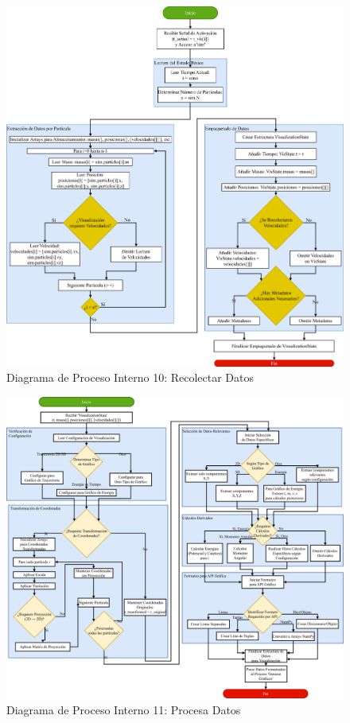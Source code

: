 \begin{figure}[H]
    \centering
    \includegraphics[width=\textwidth]{img/Analisis/DiagramaProcesos/DiagramaProceso10_RecolectarDatos.png}
    \caption{Diagrama de Proceso Interno 10: Recolectar Datos}%
    \label{fig:process_diagram10}
\end{figure}

\begin{figure}[H]
    \centering
    \includegraphics[width=\textwidth]{img/Analisis/DiagramaProcesos/DiagramaProceso011_ProcesarDatos.png}
    \caption{Diagrama de Proceso Interno 11: Procesa Datos}%
    \label{fig:process_diagram11}
\end{figure}


